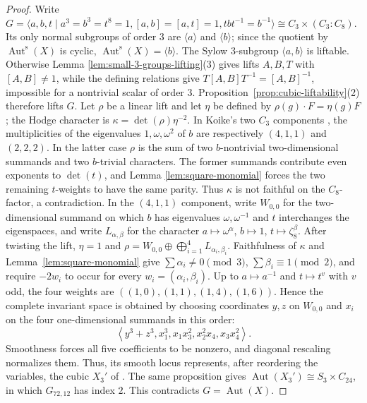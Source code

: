 \documentclass[12pt]{amsart}
\numberwithin{equation}{section}
\theoremstyle{plain}
\theoremstyle{definition}
\theoremstyle{remark}
\DeclareMathOperator{\Aut}{Aut}
\newcommand{\Auts}{\Aut^{\mathrm s}}
\begin{document}
\begin{proof}
Write
$G=\langle a,b,t\mid a^3=b^3=t^8=1,
[a,b]=[a,t]=1, tbt^{-1}=b^{-1}\rangle
\cong C_3\times(C_3:C_8)$.  Its only normal subgroups of order $3$ are
$\langle a\rangle$ and $\langle b\rangle$; since the quotient by
$\Auts(X)$ is cyclic, $\Auts(X)=\langle b\rangle$.  The Sylow
$3$-subgroup $\langle a,b\rangle$ is liftable.  Otherwise Lemma
\ref{lem:small-3-groups-lifting}(3) gives lifts $A,B,T$ with
$[A,B]\ne1$, while the defining relations give
$T[A,B]T^{-1}=[A,B]^{-1}$, impossible for a nontrivial scalar of order
$3$.  Proposition~\ref{prop:cubic-liftability}(2) therefore lifts $G$.
Let $\rho$ be a linear lift and let $\eta$ be defined by
$\rho(g)\cdot F=\eta(g)F$; the Hodge character is
$\kappa=\det(\rho)\eta^{-2}$.  In Koike's two $C_3$ components
\cite[(3.3), (3.4)]{KOIKE202512}, the multiplicities of the eigenvalues
$1,\omega,\omega^2$ of $b$ are respectively $(4,1,1)$ and $(2,2,2)$.
In the latter case $\rho$ is the sum of two $b$-nontrivial
two-dimensional summands and two $b$-trivial characters.  The former
summands contribute even exponents to $\det(t)$, and Lemma
\ref{lem:square-monomial} forces the two remaining $t$-weights to have the
same parity.  Thus $\kappa$ is not faithful on the $C_8$-factor, a
contradiction.  In the $(4,1,1)$ component, write $W_{0,0}$ for the
two-dimensional summand on which $b$ has eigenvalues
$\omega,\omega^{-1}$ and $t$ interchanges the eigenspaces, and write
$L_{\alpha,\beta}$ for the character
$a\mapsto\omega^\alpha$, $b\mapsto1$, $t\mapsto\zeta_8^\beta$.
After twisting the lift, $\eta=1$ and
$\rho=W_{0,0}\oplus\bigoplus_{i=1}^4L_{\alpha_i,\beta_i}$.  Faithfulness of
$\kappa$ and Lemma~\ref{lem:square-monomial} give
$\sum\alpha_i\ne0\pmod3$, $\sum\beta_i\equiv1\pmod2$, and require
$-2w_i$ to occur for every $w_i=(\alpha_i,\beta_i)$.  Up to
$a\mapsto a^{-1}$ and $t\mapsto t^v$ with $v$ odd, the four weights are
$((1,0),(1,1),(1,4),(1,6))$.  Hence the complete invariant space is
obtained by choosing coordinates $y,z$ on $W_{0,0}$ and $x_i$ on the four
one-dimensional summands in this order:
\[
\left\langle y^3+z^3, x_1^3, x_1x_3^2, x_2^2x_4, x_3x_4^2\right\rangle.
\]
Smoothness forces all five coefficients to be nonzero, and diagonal
rescaling normalizes them.  Thus, its smooth locus represents, after
reordering the variables, the cubic $X_3'$ of
\cite[Proposition~7.1]{FWZ26}.  The same proposition gives
$\Aut(X_3')\cong S_3\times C_{24}$, in which $G_{72,12}$ has index $2$.
This contradicts $G=\Aut(X)$.
\end{proof}
\end{document}
